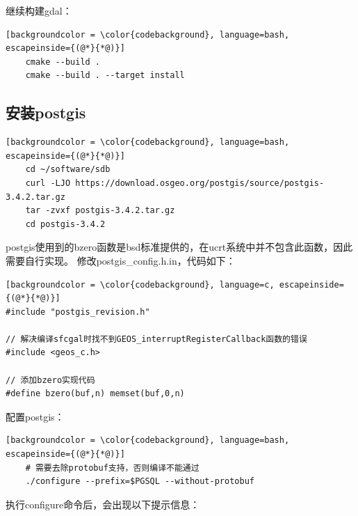 继续构建gdal：

\begin{lstlisting}[backgroundcolor = \color{codebackground}, language=bash, escapeinside={(@*}{*@)}]
	cmake --build .
	cmake --build . --target install
\end{lstlisting}

\subsection{安装postgis}
\begin{lstlisting}[backgroundcolor = \color{codebackground}, language=bash, escapeinside={(@*}{*@)}]
	cd ~/software/sdb
	curl -LJO https://download.osgeo.org/postgis/source/postgis-3.4.2.tar.gz
	tar -zvxf postgis-3.4.2.tar.gz
	cd postgis-3.4.2
\end{lstlisting}



postgis使用到的bzero函数是bsd标准提供的，在ucrt系统中并不包含此函数，因此需要自行实现。
修改postgis\_config.h.in，代码如下：

\begin{lstlisting}[backgroundcolor = \color{codebackground}, language=c, escapeinside={(@*}{*@)}]
#include "postgis_revision.h"

// 解决编译sfcgal时找不到GEOS_interruptRegisterCallback函数的错误
#include <geos_c.h>

// 添加bzero实现代码
#define bzero(buf,n) memset(buf,0,n)

\end{lstlisting}


配置postgis：

\begin{lstlisting}[backgroundcolor = \color{codebackground}, language=bash, escapeinside={(@*}{*@)}]
	# 需要去除protobuf支持，否则编译不能通过
	./configure --prefix=$PGSQL --without-protobuf
\end{lstlisting}

执行configure命令后，会出现以下提示信息：

